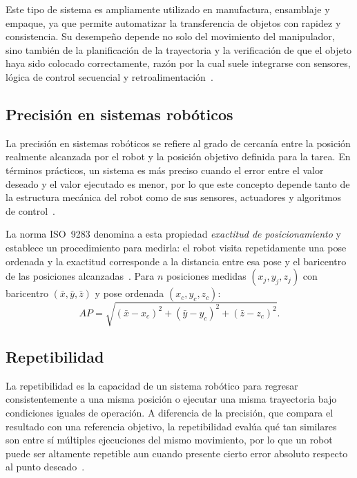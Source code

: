 Este tipo de sistema es ampliamente utilizado en manufactura, ensamblaje y empaque, ya que permite automatizar la transferencia de objetos con rapidez y consistencia. Su desempeño depende no solo del movimiento del manipulador, sino también de la planificación de la trayectoria y la verificación de que el objeto haya sido colocado correctamente, razón por la cual suele integrarse con sensores, lógica de control secuencial y retroalimentación~\cite{correll2022autonomous,lynch2017modern}.

\subsection{Precisión en sistemas robóticos}
La precisión en sistemas robóticos se refiere al grado de cercanía entre la posición realmente alcanzada por el robot y la posición objetivo definida para la tarea. En términos prácticos, un sistema es más preciso cuando el error entre el valor deseado y el valor ejecutado es menor, por lo que este concepto depende tanto de la estructura mecánica del robot como de sus sensores, actuadores y algoritmos de control~\cite{correll2022autonomous,siciliano2010robotics}.

La norma ISO~9283 denomina a esta propiedad \textit{exactitud de posicionamiento} y establece un procedimiento para medirla: el robot visita repetidamente una pose ordenada y la exactitud corresponde a la distancia entre esa pose y el baricentro de las posiciones alcanzadas~\cite{iso9283}. Para $n$ posiciones medidas $(x_j, y_j, z_j)$ con baricentro $(\bar{x}, \bar{y}, \bar{z})$ y pose ordenada $(x_c, y_c, z_c)$:
\begin{equation}
	AP = \sqrt{(\bar{x}-x_c)^2 + (\bar{y}-y_c)^2 + (\bar{z}-z_c)^2}.
\end{equation}

\subsection{Repetibilidad}
La repetibilidad es la capacidad de un sistema robótico para regresar consistentemente a una misma posición o ejecutar una misma trayectoria bajo condiciones iguales de operación. A diferencia de la precisión, que compara el resultado con una referencia objetivo, la repetibilidad evalúa qué tan similares son entre sí múltiples ejecuciones del mismo movimiento, por lo que un robot puede ser altamente repetible aun cuando presente cierto error absoluto respecto al punto deseado~\cite{iso9283,correll2022autonomous}.

